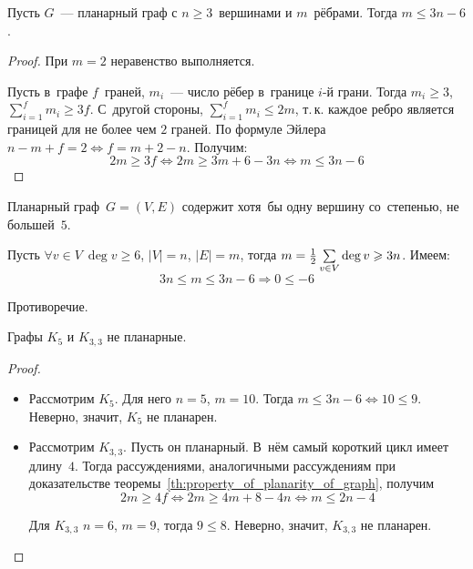 \begin{theorem}
\label{th:property_of_planarity_of_graph}
Пусть $G$~--- планарный граф с $n \geqslant 3$~вершинами и $m$~рёбрами. Тогда $m \leqslant 3n - 6$.
\end{theorem}
\begin{proof}
При $m = 2$ неравенство выполняется.

Пусть в~графе $f$~граней, $m_i$~--- число рёбер в~границе $i$-й грани.
Тогда $m_i \geqslant 3$, $\sum\limits_{i=1}^f m_i \geqslant 3f$.
С~другой стороны, $\sum\limits_{i=1}^f m_i \leqslant 2m$, т.\,к. каждое ребро является границей для не более чем $2$ граней.
По формуле Эйлера $n - m + f = 2 \Leftrightarrow f = m + 2 - n$.
Получим:
\begin{equation*}
2m \geqslant 3f \Leftrightarrow 2m \geqslant 3m + 6 - 3n \Leftrightarrow m \leqslant 3n - 6
\end{equation*}
\end{proof}

\begin{consequent}
Планарный граф~$G = (V, E)$ содержит хотя~бы одну вершину со~степенью, не большей~$5$.
\end{consequent}
\begin{proofcontra}
Пусть $\forall v \in V \ \deg v \geqslant 6$, $|V| = n$, $|E| = m$, тогда
$m \opbr= \frac12 \sum\limits_{v \in V} \deg v \opbr\geqslant 3n$.
Имеем:
\begin{equation*}
3n \leqslant m \leqslant 3n - 6 \Rightarrow 0 \leqslant -6
\end{equation*}

Противоречие.
\end{proofcontra}

\begin{theorem}
Графы $K_5$ и $K_{3,3}$ не планарные.
\end{theorem}
\begin{proof}
\begin{itemize}
	\item Рассмотрим $K_5$.
	Для него $n = 5$, $m = 10$.
	Тогда $m \leqslant 3n - 6 \Leftrightarrow 10 \leqslant 9$.	
	Неверно, значит, $K_5$ не планарен.
	\item Рассмотрим $K_{3,3}$.
	Пусть он планарный.
	В~нём самый короткий цикл имеет длину~$4$.
	Тогда рассуждениями, аналогичными рассуждениям при доказательстве теоремы~\ref*{th:property_of_planarity_of_graph}, получим
	\begin{equation*}
	2m \geqslant 4f \Leftrightarrow 2m \geqslant 4m + 8 - 4n \Leftrightarrow m \leqslant 2n - 4
	\end{equation*}
	
	Для $K_{3,3}$ $n = 6$, $m = 9$, тогда $9 \leqslant 8$.
	Неверно, значит, $K_{3,3}$ не планарен.
\end{itemize}
\end{proof}

